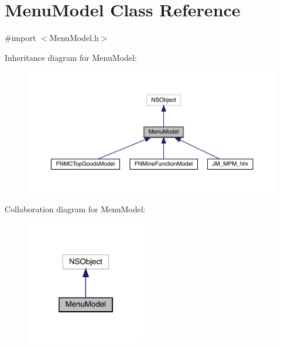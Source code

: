 \hypertarget{interface_menu_model}{}\section{Menu\+Model Class Reference}
\label{interface_menu_model}


{\ttfamily \#import $<$Menu\+Model.\+h$>$}



Inheritance diagram for Menu\+Model\+:\nopagebreak
\begin{figure}[H]
\begin{center}
\leavevmode
\includegraphics[width=350pt]{interface_menu_model__inherit__graph}
\end{center}
\end{figure}


Collaboration diagram for Menu\+Model\+:\nopagebreak
\begin{figure}[H]
\begin{center}
\leavevmode
\includegraphics[width=148pt]{interface_menu_model__coll__graph}
\end{center}
\end{figure}
